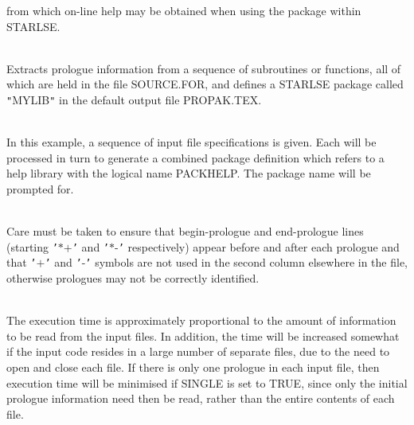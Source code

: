 \documentclass[twoside,11pt]{article}
\renewcommand{\_}{\texttt{\symbol{95}}}
\newlength{\sstexampleslength}
\newcommand{\sstexamplesubsection}[2]{\sloppy
\item[\parbox{\sstexampleslength}{\ssttt #1}] \mbox{} \vspace{1.0ex}
\\ #2 }
\newcommand{\sstnotes}[1]{\item[Notes:] \mbox{} \\[1.3ex] #1}
\newcommand{\sstdiytopic}[2]{\item[{\hspace{-0.35em}#1\hspace{-0.35em}:}]
\mbox{} \\[1.3ex] #2}
\newcommand{\sstexamplesubsection}[2]{\item[{\ssttt #1}] #2}
\newcommand{\sstnotes}[1]{\item[Notes:] #1 }
\newcommand{\sstdiytopic}[2]{\item[{#1}] #2 }
\begin{document}
{{{         from which on-line help may be obtained when using the package
         within STARLSE.
      }
      \sstexamplesubsection{
         PROPAK IN=SOURCE.FOR PACK=MYLIB NOSINGLE
      }{
         Extracts prologue information from a sequence of subroutines
         or functions, all of which are held in the file SOURCE.FOR,
         and defines a STARLSE package called {\tt "}MYLIB{\tt "} in the default
         output file PROPAK.TEX.
      }
      \sstexamplesubsection{
         PROPAK IN=[{\tt "}A$*$.FOR{\tt "},{\tt "}B$*$.FOR{\tt "}] HELP=PACK\_HELP
      }{
         In this example, a sequence of input file specifications is
         given. Each will be processed in turn to generate a combined
         package definition which refers to a help library with the
         logical name PACK\_HELP. The package name will be prompted for.
      }
   }
   \sstnotes{
      Care must be taken to ensure that begin-prologue and end-prologue
      lines (starting {\tt '}$*$$+${\tt '} and {\tt '}$*$-{\tt '} respectively) appear before and
      after each prologue and that {\tt '}$+${\tt '} and {\tt '}-{\tt '} symbols are not used in
      the second column elsewhere in the file, otherwise prologues may
      not be correctly identified.
   }
   \sstdiytopic{
      Timing
   }{
      The execution time is approximately proportional to the amount of
      information to be read from the input files. In addition, the
      time will be increased somewhat if the input code resides in a
      large number of separate files, due to the need to open and close
      each file. If there is only one prologue in each input file, then
      execution time will be minimised if SINGLE is set to TRUE, since
      only the initial prologue information need then be read, rather
      than the entire contents of each file.
   }
}
\end{document}
